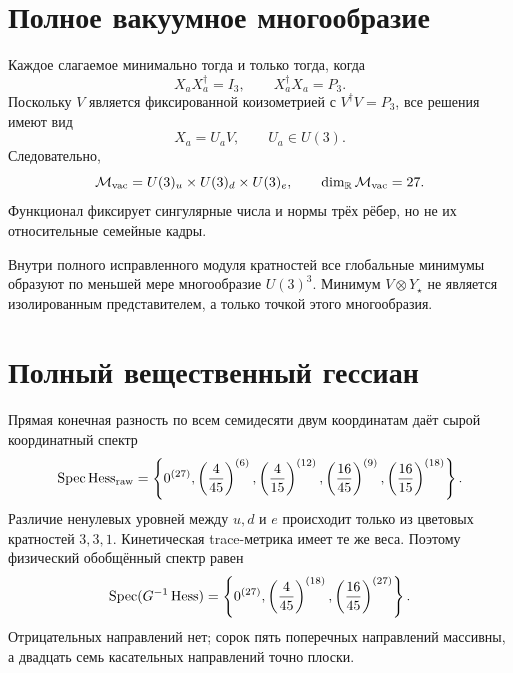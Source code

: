 \section{Полное вакуумное многообразие}

Каждое слагаемое минимально тогда и только тогда, когда
\begin{equation}
 X_aX_a^\dagger=I_3,
 \qquad
 X_a^\dagger X_a=P_3.
 \label{eq:v7-edge-coisometry-conditions}
\end{equation}
Поскольку $V$ является фиксированной коизометрией с $V^\dagger V=P_3$,
все решения имеют вид
\begin{equation}
 X_a=U_aV,
 \qquad U_a\in U(3).
\end{equation}
Следовательно,
\begin{equation}
 \mathcal M_{\rm vac}=U(3)_u\times U(3)_d\times U(3)_e,
 \qquad
 \dim_{\mathbb R}\mathcal M_{\rm vac}=27.
 \label{eq:v7-relative-edge-vacuum-manifold}
\end{equation}
Функционал фиксирует сингулярные числа и нормы трёх рёбер, но не их
относительные семейные кадры.

\begin{theorem}
Внутри полного исправленного модуля кратностей все глобальные минимумы
образуют по меньшей мере многообразие $U(3)^3$. Минимум $V\otimes Y_\star$
не является изолированным представителем, а только точкой этого
многообразия.
\end{theorem}

\section{Полный вещественный гессиан}

Прямая конечная разность по всем семидесяти двум координатам даёт сырой
координатный спектр
\begin{equation}
 \operatorname{Spec}\operatorname{Hess}_{\rm raw}=
 \left\{
 0^{(27)},
 \left(\frac4{45}\right)^{(6)},
 \left(\frac4{15}\right)^{(12)},
 \left(\frac{16}{45}\right)^{(9)},
 \left(\frac{16}{15}\right)^{(18)}
 \right\}.
 \label{eq:v7-relative-edge-raw-hessian}
\end{equation}
Различие ненулевых уровней между $u,d$ и $e$ происходит только из цветовых
кратностей $3,3,1$. Кинетическая trace-метрика имеет те же веса. Поэтому
физический обобщённый спектр равен
\begin{equation}
 \operatorname{Spec}(G^{-1}\operatorname{Hess})=
 \left\{
 0^{(27)},
 \left(\frac4{45}\right)^{(18)},
 \left(\frac{16}{45}\right)^{(27)}
 \right\}.
 \label{eq:v7-relative-edge-generalized-hessian}
\end{equation}
Отрицательных направлений нет; сорок пять поперечных направлений массивны,
а двадцать семь касательных направлений точно плоски.

